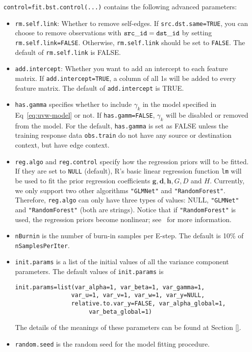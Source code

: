  {\tt control=fit.bst.control(...)} contains the following advanced parameters:
\begin{itemize}
\item {\tt rm.self.link}: Whether to remove self-edges.  If {\tt src.dst.same=TRUE}, you can choose to remove observations with ${\tt src\_id} = {\tt dst\_id}$ by setting {\tt rm.self.link=FALSE}.  Otherwise, {\tt rm.self.link} should be set to {\tt FALSE}. The default of {\tt rm.self.link} is FALSE.
\item {\tt add.intercept}: Whether you want to add an intercept to each feature matrix.  If {\tt add.intercept=TRUE}, a column of all 1s will be added to every feature matrix. The default of {\tt add.intercept} is TRUE.
\item {\tt has.gamma} specifies whether to include $\gamma_k$ in the model specified in Eq~\ref{eq:uvw-model} or not.  If {\tt has.gamm=FALSE}, $\gamma_k$ will be disabled or removed from the model. For the default, {\tt has.gamma} is set as FALSE unless the training response data {\tt obs.train} do not have any source or destination context, but have edge context.
\item {\tt reg.algo} and {\tt reg.control} specify how the regression priors will to be fitted.  If they are set to {\tt NULL} (default), R's basic linear regression function {\tt lm} will be used to fit the prior regression coefficients $\bm{g}, \bm{d}, \bm{h}, G, D$ and $H$.  Currently, we only support two other algorithms {\tt "GLMNet"} and {\tt "RandomForest"}. Therefore, {\tt reg.algo} can only have three types of values: NULL, {\tt "GLMNet"} and {\tt "RandomForest"} (both are strings). Notice that if {\tt "RandomForest"} is used, the regression priors become nonlinear; see~\cite{gmf:recsys11} for more information.
\item {\tt nBurnin} is the number of burn-in samples per E-step. The default is 10\% of {\tt nSamplesPerIter}.
\item {\tt init.params} is a list of the initial values of all the variance component parameters. The default values of {\tt init.params} is
{\small\begin{verbatim}
init.params=list(var_alpha=1, var_beta=1, var_gamma=1,
                var_u=1, var_v=1, var_w=1, var_y=NULL,
                relative.to.var_y=FALSE, var_alpha_global=1, 
					 var_beta_global=1)
\end{verbatim}}
The details of the meanings of these parameters can be found at Section \ref{}.
\item {\tt random.seed} is the random seed for the model fitting procedure.
\end{itemize}
